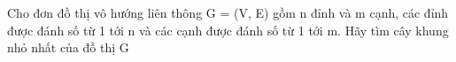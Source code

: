 Cho đơn đồ thị vô hướng liên thông G = (V, E) gồm n đỉnh và m cạnh, các đỉnh được đánh số từ 1 tới n và các cạnh được đánh số từ 1 tới m. Hãy tìm cây khung nhỏ nhất của đồ thị G